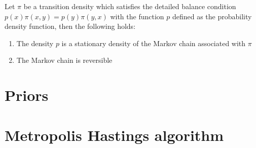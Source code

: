 \begin{mytheorem}\label{theo:detailed_balance}
Let $\pi$ be a transition density which satisfies the detailed balance condition $p(x)\pi(x, y) = p(y)\pi(y, x)$ with the function $p$ defined as the probability density function, then the following holds:
\begin{enumerate}
    \item The density $p$ is a stationary density of the Markov chain associated with $\pi$
    \item The Markov chain is reversible
\end{enumerate}


\end{mytheorem}



\section{Priors}

\section{Metropolis Hastings algorithm} \label{sec:Metropolis_Hastings}

